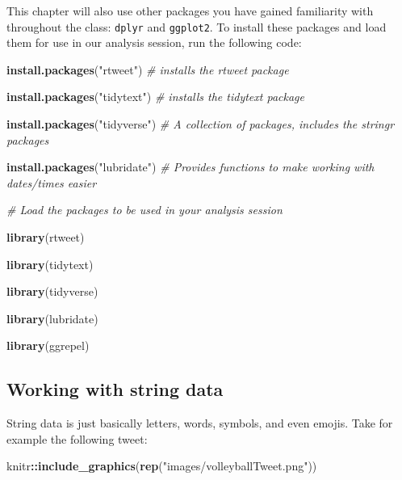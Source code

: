 \documentclass[]{book}
\newenvironment{Shaded}{\begin{snugshade}}{\end{snugshade}}
\newcommand{\CommentTok}[1]{\textcolor[rgb]{0.56,0.35,0.01}{\textit{#1}}}
\newcommand{\KeywordTok}[1]{\textcolor[rgb]{0.13,0.29,0.53}{\textbf{#1}}}
\newcommand{\NormalTok}[1]{#1}
\newcommand{\OperatorTok}[1]{\textcolor[rgb]{0.81,0.36,0.00}{\textbf{#1}}}
\newcommand{\StringTok}[1]{\textcolor[rgb]{0.31,0.60,0.02}{#1}}
\begin{document}
This chapter will also use other packages you have gained familiarity with throughout the class: \texttt{dplyr} and \texttt{ggplot2}. To install these packages and load them for use in our analysis session, run the following code:

\begin{Shaded}
\begin{Highlighting}[]
\KeywordTok{install.packages}\NormalTok{(}\StringTok{"rtweet"}\NormalTok{) }\CommentTok{# installs the rtweet package}

\KeywordTok{install.packages}\NormalTok{(}\StringTok{"tidytext"}\NormalTok{) }\CommentTok{# installs the tidytext package}

\KeywordTok{install.packages}\NormalTok{(}\StringTok{"tidyverse"}\NormalTok{) }\CommentTok{# A collection of packages, includes the stringr packages}

\KeywordTok{install.packages}\NormalTok{(}\StringTok{"lubridate"}\NormalTok{) }\CommentTok{# Provides functions to make working with dates/times easier}
\end{Highlighting}
\end{Shaded}

\begin{Shaded}
\begin{Highlighting}[]
\CommentTok{# Load the packages to be used in your analysis session}

\KeywordTok{library}\NormalTok{(rtweet)}

\KeywordTok{library}\NormalTok{(tidytext)}

\KeywordTok{library}\NormalTok{(tidyverse)}

\KeywordTok{library}\NormalTok{(lubridate)}

\KeywordTok{library}\NormalTok{(ggrepel)}
\end{Highlighting}
\end{Shaded}

\hypertarget{working-with-string-data}{%
\subsection{Working with string data}\label{working-with-string-data}}

String data is just basically letters, words, symbols, and even emojis. Take for example the following tweet:

\begin{Shaded}
\begin{Highlighting}[]
\NormalTok{knitr}\OperatorTok{::}\KeywordTok{include_graphics}\NormalTok{(}\KeywordTok{rep}\NormalTok{(}\StringTok{"images/volleyballTweet.png"}\NormalTok{))}
\end{Highlighting}
\end{Shaded}
\end{document}

